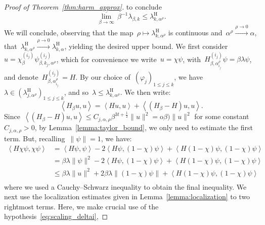 \documentclass[10pt]{article}
\newcommand{\1}{\mathbbm 1}
\newcommand{\scalingExp}{t}
\newcommand{\shift}{\rho} %
\renewcommand{\o}{\mathrm{o}}
\begin{document}
\begin{proof}[Proof of Theorem~\ref{thm:harm_approx}]
        to conclude
        \[\underset{\beta\to\infty}{\overline\lim}\,\beta^{-1}\lambda_{\beta,k} \leq \lambda_{k,\alpha^\shift}^{\mathrm{H}}.\]
        We will conclude, observing that the map~$\shift\mapsto\lambda_{k,\alpha^\shift}^{\mathrm{H}}$ is continuous and~$\alpha^\shift \overset{\shift\to 0}{\longrightarrow} \alpha$, 
        that~$\lambda_{k,\alpha^\shift}^{\mathrm{H}}\overset{\shift\to 0}{\longrightarrow} \lambda_{k,\alpha}^{\mathrm H}$, yielding the desired upper bound.
        We first consider~$u = \chi_\beta^{(i_j)} \psi_{\beta,k_j,\alpha^\shift}^{(i_j)}$, which for convenience we write~$u=\chi\psi$, with~$H_{\beta,\alpha_{i_j}^\shift}^{(i_j)} \psi = \beta\lambda\psi$, and denote~$H_{\beta,\alpha_{i_j}^\shift}^{(i_j)}=H$.
        By our choice of~$(\varphi_j)_{1\leq j\leq k}$, we have~$\lambda \in (\lambda_{j,\alpha^\shift}^{\mathrm H})_{1\leq j\leq k}$, and so~$\lambda\leq \lambda_{k,\alpha^\shift}^{\mathrm H}$.
        We then write:
        \[\left\langle H_\beta u,u\right\rangle = \left\langle H u,u\right\rangle + \left\langle (H_\beta - H)u,u\right\rangle.\]
        Since~$\left\langle (H_\beta-H)u,u\right\rangle \leq C_{j,\alpha,\shift}\beta^{3\scalingExp+\frac12}\|u\|^2 = \o\beta)\|u\|^2$ for some constant~$C_{j,\alpha,\shift}>0$, by Lemma~\ref{lemma:taylor_bound}, we only need to estimate the first term.
        But, recalling~$\|\psi\| = 1$, we have:
        \[\begin{aligned}
            \left\langle H\chi\psi,\chi\psi\right\rangle &= \left\langle H\psi,\psi\right\rangle - 2\left\langle H\psi,(1-\chi)\psi\right\rangle + \left\langle H(1-\chi)\psi,(1-\chi)\psi\right\rangle\\
            & = \beta\lambda\|\psi\|^2 - 2\left\langle H\psi,(1-\chi)\psi\right\rangle + \left\langle H(1-\chi)\psi,(1-\chi)\psi\right\rangle\\
            &\leq \beta\lambda\|u\|^2 + 2\beta\lambda\|(1-\chi)\psi\| + \left\langle H(1-\chi)\psi,(1-\chi)\psi\right\rangle\\
        \end{aligned}\]
        where we used a Cauchy--Schwarz inequality to obtain the final inequality.
        We next use the localization estimates given in Lemma~\ref{lemma:localization} to two rightmost terms. Here, we make crucial use of the hypothesis~\eqref{eq:scaling_deltai},

\end{proof}
\end{document}
